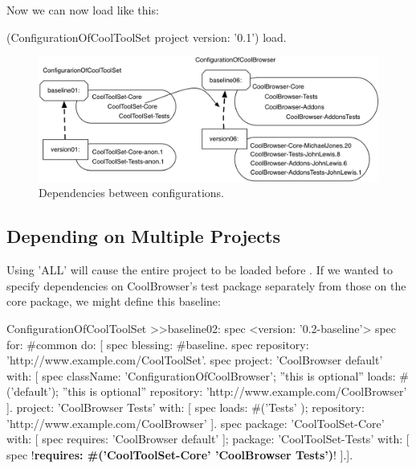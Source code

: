\documentclass[a4paper,10pt,twoside]{book}
\begin{document}
Now we can now load  like this:

\begin{code}{}
(ConfigurationOfCoolToolSet project version: '0.1') load.
\end{code}

                

\begin{figure}
\begin{center}
\includegraphics[width=0.9\linewidth]{version07}
\caption{Dependencies between configurations.\label{fig:version07}}
\end{center}
\end{figure} 



\subsection{Depending on Multiple Projects}

Using 'ALL' will cause the entire  project to be loaded before . 
If we wanted to specify dependencies on CoolBrowser's test package separately from those on the core package, we might define this baseline:

\begin{code}{}
ConfigurationOfCoolToolSet >>baseline02: spec 
       <version: '0.2-baseline'>
       spec for: #common do: [
              spec blessing: #baseline.
              spec repository: 'http://www.example.com/CoolToolSet'.
              spec
                    project: 'CoolBrowser default' with: [
                            spec
                                   className: 'ConfigurationOfCoolBrowser'; ''this is optional''
                                   loads: #('default');  ''this is optional''
                                   repository: 'http://www.example.com/CoolBrowser' ].
                    project: 'CoolBrowser Tests' with: [
                            spec
                                   loads: #('Tests' ); 
                                   repository: 'http://www.example.com/CoolBrowser' ].
              spec 
                     package: 'CoolToolSet-Core' with: [ spec requires: 'CoolBrowser default' ];
                     package: 'CoolToolSet-Tests' with: [ 
                            spec !\textbf{requires: \#('CoolToolSet-Core'  'CoolBrowser Tests')}! ].].                     
\end{code}
\end{document}
